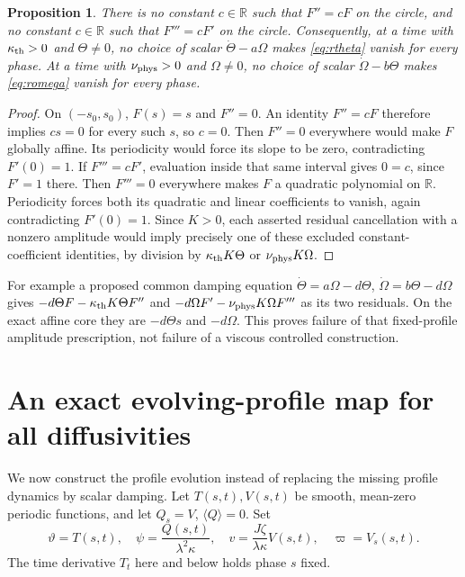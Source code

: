 \documentclass[11pt]{article}
\newtheorem{proposition}{Proposition}
\newcommand{\R}{\mathbb R}
\newcommand{\thd}{\kappa_{\rm th}}
\newcommand{\vis}{\nu_{\rm phys}}
\newcommand{\av}[1]{\langle #1\rangle}
\begin{document}
\begin{proposition}\label{prop:noeig}
There is no constant $c\in\R$ such that $F''=cF$ on the circle, and no
constant $c\in\R$ such that $F'''=cF'$ on the circle. Consequently, at
a time with $\thd>0$ and $\Theta\ne0$, no choice of scalar
$\dot\Theta-a\Omega$ makes \eqref{eq:rtheta} vanish for every phase.
At a time with $\vis>0$ and $\Omega\ne0$, no choice of scalar
$\dot\Omega-b\Theta$ makes \eqref{eq:romega} vanish for every phase.
\end{proposition}
\begin{proof}
On $(-s_0,s_0)$, $F(s)=s$ and $F''=0$. An identity $F''=cF$ therefore
implies $cs=0$ for every such $s$, so $c=0$. Then $F''=0$ everywhere
would make $F$ globally affine. Its periodicity would force its slope to be
zero, contradicting $F'(0)=1$.
If $F'''=cF'$, evaluation inside that same interval gives $0=c$, since
$F'=1$ there. Then $F'''=0$ everywhere makes $F$ a quadratic polynomial
on $\R$. Periodicity forces both its quadratic and linear coefficients
to vanish, again contradicting $F'(0)=1$.
Since $K>0$, each asserted residual cancellation with a nonzero amplitude
would imply precisely one of these excluded constant-coefficient
identities, by division by $\thd K\Theta$ or $\vis K\Omega$.
\end{proof}

For example a proposed common damping equation
$\dot\Theta=a\Omega-d\Theta$, $\dot\Omega=b\Theta-d\Omega$ gives
$-d\Theta F-\thd K\Theta F''$ and
$-d\Omega F'-\vis K\Omega F'''$ as its two residuals. On the exact affine
core they are $-d\Theta s$ and $-d\Omega$.
This proves failure of that fixed-profile amplitude prescription, not
failure of a viscous controlled construction.

\section{An exact evolving-profile map for all diffusivities}

We now construct the profile evolution instead of replacing the missing
profile dynamics by scalar damping. Let $T(s,t),V(s,t)$ be smooth,
mean-zero periodic functions, and let $Q_s=V$, $\av Q=0$. Set
\begin{equation}\label{eq:generalprofile}
 \vartheta=T(s,t),\quad \psi=\frac{Q(s,t)}{\lambda^2\kappa},\quad
 v=\frac{J\zeta}{\lambda\kappa}V(s,t),\quad \varpi=V_s(s,t).
\end{equation}
The time derivative $T_t$ here and below holds phase $s$ fixed.
\end{document}
